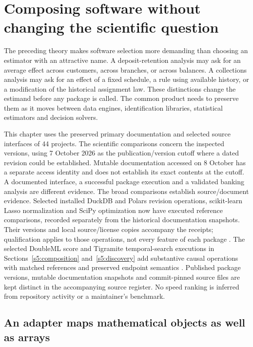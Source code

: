 \chapter{Composing software without changing the scientific question}
\label{r3:software}

The preceding theory makes software selection more demanding than choosing
an estimator with an attractive name. A deposit-retention analysis may ask
for an average effect across customers, across branches, or across balances.
A collections analysis may ask for an effect of a fixed schedule, a rule
using available history, or a modification of the historical assignment
law. These distinctions change the estimand before any package is called.
The common product needs to preserve them as it moves between data engines,
identification libraries, statistical estimators and decision solvers.

This chapter uses the preserved primary documentation and selected source
interfaces of 44 projects. The scientific comparisons concern the inspected
versions, using 7 October 2026 as the publication/version cutoff where a
dated revision could be established. Mutable documentation accessed on
8 October has a separate access identity and does not establish its exact
contents at the cutoff. A documented interface, a successful
package execution and a validated banking analysis are different evidence.
The broad comparisons establish source/document evidence. Selected installed
DuckDB and Polars revision operations, scikit-learn Lasso normalization and
SciPy optimization now have executed reference comparisons, recorded
separately from the historical documentation snapshots. Their versions and
local source/license copies accompany the receipts; qualification applies
to those operations, not every feature of each package
\citep{runtime_duckdb,runtime_polars,runtime_scikit_learn,runtime_scipy,runtime_numpy}.
The selected DoubleML score and Tigramite temporal-search executions in
Sections~\ref{s5:composition} and~\ref{s5:discovery} add substantive causal
operations with matched references and preserved endpoint semantics
\citep{runtime_doubleml_scope,runtime_tigramite_scope}.
Published package versions, mutable documentation snapshots and
commit-pinned source files are kept distinct in the accompanying source
register. No speed ranking is inferred from repository activity or a
maintainer's benchmark.

\section{An adapter maps mathematical objects as well as arrays}
\label{r3:software-types}

